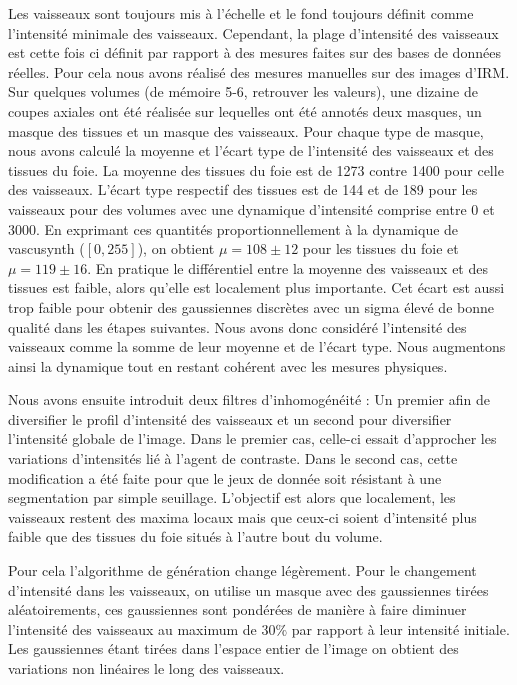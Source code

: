 Les vaisseaux sont toujours mis à l'échelle et le fond toujours définit comme l'intensité minimale des vaisseaux. Cependant, la plage d'intensité des vaisseaux est cette fois ci définit par rapport à des mesures faites sur des bases de données réelles. Pour cela nous avons réalisé des mesures manuelles sur des images d'IRM. Sur quelques volumes (de mémoire 5-6, retrouver les valeurs), une dizaine de coupes axiales ont été réalisée sur lequelles ont été annotés deux masques, un masque des tissues et un masque des vaisseaux. Pour chaque type de masque, nous avons calculé la moyenne et l'écart type de l'intensité des vaisseaux et des tissues du foie. La moyenne des tissues du foie est de 1273 contre 1400 pour celle des vaisseaux. L'écart type respectif des tissues est de 144 et de 189 pour les vaisseaux pour des volumes avec une dynamique d'intensité comprise entre 0 et 3000. En exprimant ces quantités proportionnellement à la dynamique de vascusynth ($[0,255]$), on obtient $\mu=108 \pm 12$ pour les tissues du foie et $\mu=119 \pm 16$. En pratique le différentiel entre la moyenne des vaisseaux et des tissues est faible, alors qu'elle est localement plus importante. Cet écart est aussi trop faible pour obtenir des gaussiennes discrètes avec un sigma élevé de bonne qualité dans les étapes suivantes. Nous avons donc considéré l'intensité des vaisseaux comme la somme de leur moyenne et de l'écart type. Nous augmentons ainsi la dynamique tout en restant cohérent avec les mesures physiques.

Nous avons ensuite introduit deux filtres d'inhomogénéité : Un premier afin de diversifier le profil d'intensité des vaisseaux et un second pour diversifier l'intensité globale de l'image. Dans le premier cas, celle-ci essait d'approcher les variations d'intensités lié à l'agent de contraste. Dans le second cas, cette modification a été faite pour que le jeux de donnée soit résistant à une segmentation par simple seuillage. L'objectif est alors que localement, les vaisseaux restent des maxima locaux mais que ceux-ci soient d'intensité plus faible que des tissues du foie situés à l'autre bout du volume.

Pour cela l'algorithme de génération change légèrement. Pour le changement d'intensité dans les vaisseaux, on utilise un masque avec des gaussiennes tirées aléatoirements, ces gaussiennes sont pondérées de manière à faire diminuer l'intensité des vaisseaux au maximum de $30\%$ par rapport à leur intensité initiale. Les gaussiennes étant tirées dans l'espace entier de l'image on obtient des variations non linéaires le long des vaisseaux.


